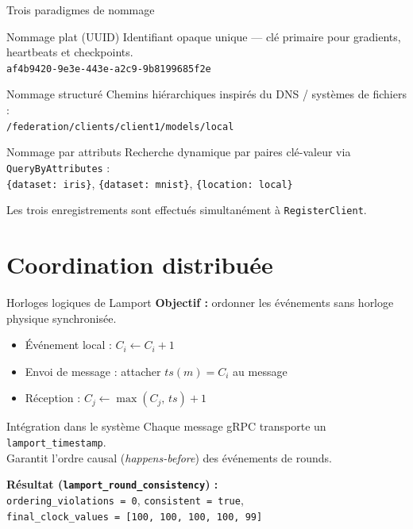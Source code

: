 \documentclass[11pt,french]{beamer}
\begin{document}
\begin{frame}{Trois paradigmes de nommage}
  \begin{block}{Nommage plat (UUID)}
    Identifiant opaque unique --- clé primaire pour gradients, heartbeats et checkpoints. \\
    \small\texttt{af4b9420-9e3e-443e-a2c9-9b8199685f2e}
  \end{block}

  \begin{block}{Nommage structuré}
    Chemins hiérarchiques inspirés du DNS / systèmes de fichiers : \\
    \small\texttt{/federation/clients/client1/models/local}
  \end{block}

  \begin{block}{Nommage par attributs}
    Recherche dynamique par paires clé-valeur via \texttt{QueryByAttributes} : \\
    \small\texttt{\{dataset: iris\}}, \texttt{\{dataset: mnist\}}, \texttt{\{location: local\}}
  \end{block}

  \vspace{0.2cm}
  \small Les trois enregistrements sont effectués simultanément à \texttt{RegisterClient}.
\end{frame}

\section{Coordination distribuée}

\begin{frame}{Horloges logiques de Lamport}
  \textbf{Objectif :} ordonner les événements sans horloge physique synchronisée.

  \vspace{0.3cm}
  \begin{itemize}
    \item Événement local : $C_i \leftarrow C_i + 1$
    \item Envoi de message : attacher $ts(m) = C_i$ au message
    \item Réception : $C_j \leftarrow \max(C_j,\, ts) + 1$
  \end{itemize}

  \vspace{0.3cm}
  \begin{block}{Intégration dans le système}
    Chaque message gRPC transporte un \texttt{lamport\_timestamp}. \\
    Garantit l'ordre causal (\textit{happens-before}) des événements de rounds.
  \end{block}

  \textbf{Résultat (\texttt{lamport\_round\_consistency}) :} \\
  \texttt{ordering\_violations = 0}, \texttt{consistent = true}, \\
  \texttt{final\_clock\_values = [100, 100, 100, 100, 99]}
\end{frame}
\end{document}
